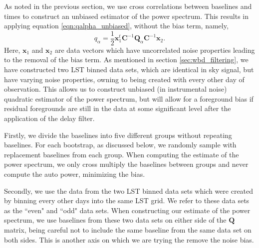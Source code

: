 \documentclass[twocolumn,numberedappendix]{emulateapj} \shorttitle{PSA64}
\newcommand{\x}{\mathbf{x}} \newcommand{\xhat}{\hat{\mathbf{x}}}
\begin{document}
As noted in the previous section, we use cross correlations between baselines
and times to construct an unbiased estimator of the power spectrum. This results
in applying equation \ref{eqn:qalpha_unbiased}, without the bias term, namely, 
\begin{equation}
\label{eqn:qalpha_nobias}
    q_{\alpha} =
        \frac{1}{2}\x_{1}^{t}\mathbf{C}^{-1}\mathbf{Q}_{\alpha}\mathbf{C}^{-1}\x_{2}.
\end{equation}
Here, $\x_{1}$ and $\x_{2}$ are data vectors which have uncorrelated noise
properties leading to the removal of the bias term. As mentioned in section
\ref{sec:wbd_filtering}, we have constructed two LST binned data sets, which are identical
in sky signal, but have varying noise properties, owning to being created with
every other day of observation.  This allows us to construct unbiased (in
instrumental noise) quadratic estimator of the power spectrum, but will allow
for a foreground bias if residual foregrounds are still in the data at some
significant level after the application of the delay filter.


Firstly, we divide the baselines into five different groups without repeating
baselines. For each bootstrap, as discussed below, we randomly sample with
replacement baselines from each group. When computing the estimate of the power
spectrum, we only cross multiply the baselines between groups and never compute
the auto power, minimizing the bias.

Secondly, we use the data from the two LST binned data sets which were created
by binning every other days into the same LST grid. We refer to these data sets
as the ``even" and ``odd" data sets. When constructing our estimate of the power
spectrum, we use baselines from these two data sets on either side of the
$\mathbf{Q}$ matrix, being careful not to include the same baseline from the
same data set on both sides. This is another axis on which we are trying the
remove the noise bias.
\end{document}

